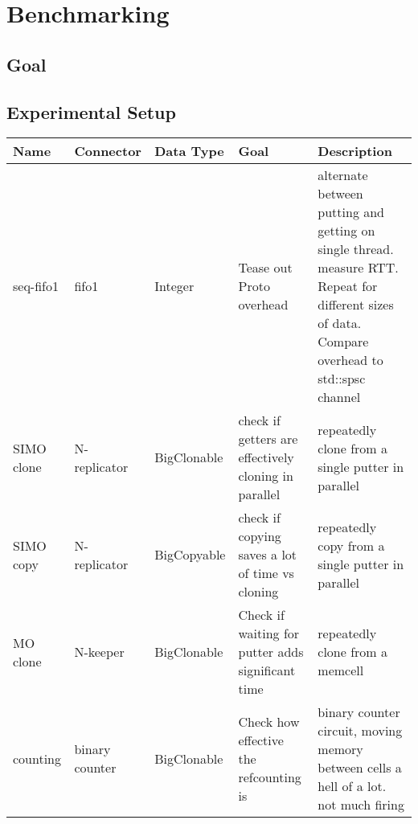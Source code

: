 \chapter{Benchmarking}
\label{sec:benchmarking}

\section{Goal}
\section{Experimental Setup}

\begin{landscape}
\begin{table}[p!]
	\begin{adjustbox}{width=19cm}
	\begin{tabular}{l|ll|p{46mm}p{67mm}}
		\rowcolor{gray!20}
		Name                  & Connector      & Data Type   & Goal                                                                     & Description                                                                                                                                    \\ \hline
		seq-fifo1             & fifo1          & Integer     & Tease out Proto overhead                                                 & alternate between putting and getting on single thread. measure RTT. Repeat for different sizes of data. Compare overhead to std::spsc channel \\
		SIMO clone            & N-replicator   & BigClonable & check if getters are effectively cloning in parallel                     & repeatedly clone from a single putter in parallel                                                                                              \\
		SIMO copy             & N-replicator   & BigCopyable & check if copying saves a lot of time vs cloning                          & repeatedly copy from a single putter in parallel                                                                                               \\
		MO clone              & N-keeper       & BigClonable & Check if waiting for putter adds significant time                        & repeatedly clone from a memcell                                                                                                                \\
		counting              & binary counter & BigClonable & Check how effective the refcounting is                                   & binary counter circuit, moving memory between cells a hell of a lot. not much firing                                                           \\

\end{tabular}
\end{adjustbox}
\end{table}
\end{landscape}
